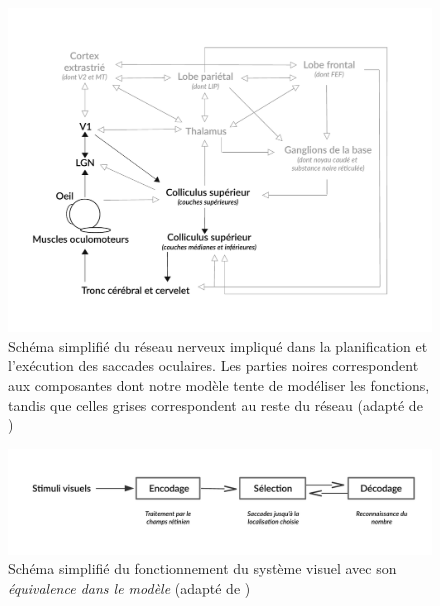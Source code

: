\begin{figure}[th]
\centering
\includegraphics[scale=0.8]{Figures/saccadic_sys}
\decoRule %
\caption[Figure]{Schéma simplifié du réseau nerveux impliqué dans la planification et l'exécution des saccades oculaires. Les parties noires correspondent aux composantes dont notre modèle tente de modéliser les fonctions, tandis que celles grises correspondent au reste du réseau (adapté de \cite{Zhaoping2014})}
\label{fig:saccadic_sys}
\end{figure}

\begin{figure}[th]
\centering
\includegraphics[scale=0.75]{Figures/visual_system_simple}
\decoRule %
\caption[Figure]{Schéma simplifié du fonctionnement du système visuel avec son \textit{équivalence dans le modèle} (adapté de \cite{Zhaoping2014})}
\label{fig:visual_system_simple}
\end{figure}


